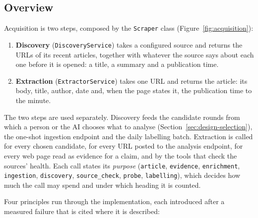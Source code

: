 
\subsection{Overview}
\label{subsec:scraping-overview}

Acquisition is two steps, composed by the \texttt{Scraper} class
(Figure~\ref{fig:acquisition}):

\begin{enumerate}
    \item \textbf{Discovery} (\texttt{DiscoveryService}) takes a
    configured source and returns the URLs of its recent articles,
    together with whatever the source says about each one before it is
    opened: a title, a summary and a publication time.
    \item \textbf{Extraction} (\texttt{ExtractorService}) takes one
    URL and returns the article: its body, title, author, date and,
    when the page states it, the publication time to the minute.
\end{enumerate}

The two steps are used separately. Discovery feeds the candidate
rounds from which a person or the AI chooses what to analyse
(Section~\ref{sec:design-selection}), the one-shot ingestion endpoint
and the daily labelling batch. Extraction is called for every chosen
candidate, for every URL posted to the analysis endpoint, for every
web page read as evidence for a claim, and by the tools that check the
sources' health. Each call states its \emph{purpose}
(\texttt{article}, \texttt{evidence}, \texttt{enrichment},
\texttt{ingestion}, \texttt{discovery}, \texttt{source\_check},
\texttt{probe}, \texttt{labelling}), which decides how much the call
may spend and under which heading it is counted.

Four principles run through the implementation, each introduced after
a measured failure that is cited where it is described:


